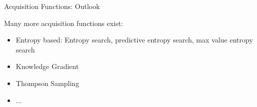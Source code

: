 \documentclass[11pt,compress,t,notes=noshow, xcolor=table]{beamer}
\begin{document}
\begin{vbframe}{Acquisition Functions: Outlook}

Many more acquisition functions exist:

\begin{itemize}
  \item Entropy based: Entropy search, predictive entropy search, max value entropy search
  \item Knowledge Gradient
  \item Thompson Sampling
  \item ...
\end{itemize}

\end{vbframe}

\endlecture
\end{document}
